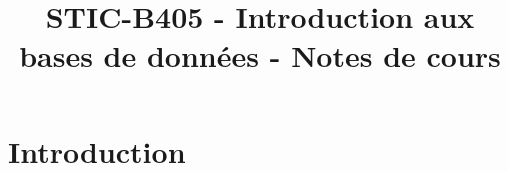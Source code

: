 

\title{STIC-B405 - Introduction aux bases de données - Notes de cours}




\maketitle

\section{Introduction}


